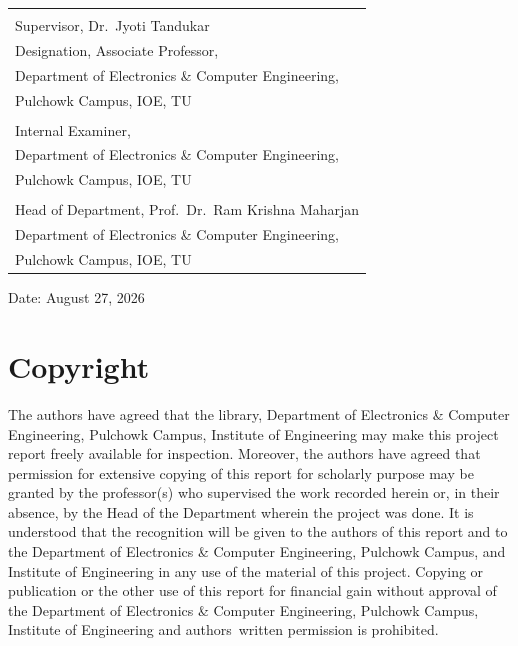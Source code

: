 \documentclass[12pt,a4paper]{report}
\begin{document}
\vspace{0.6cm}
\begin{flushright}
\begin{tabular}{l}
\underline{\hspace{8cm}}\\
Supervisor, Dr.\ Jyoti Tandukar\\
Designation, Associate Professor,\\
Department of Electronics \& Computer Engineering,\\
Pulchowk Campus, IOE, TU\\[0.8cm]

\underline{\hspace{8cm}}\\
Internal Examiner,\\
Department of Electronics \& Computer Engineering,\\
Pulchowk Campus, IOE, TU\\[0.8cm]

\underline{\hspace{8cm}}\\
Head of Department, Prof.\ Dr.\ Ram Krishna Maharjan\\
Department of Electronics \& Computer Engineering,\\
Pulchowk Campus, IOE, TU
\end{tabular}
\end{flushright}

\vfill
\noindent Date: August 27, 2026

\chapter*{Copyright}

The authors have agreed that the library, Department of Electronics \& Computer Engineering, Pulchowk Campus, Institute of Engineering may make this project report freely available for inspection. Moreover, the authors have agreed that permission for extensive copying of this report for scholarly purpose may be granted by the professor(s) who supervised the work recorded herein or, in their absence, by the Head of the Department wherein the project was done. It is understood that the recognition will be given to the authors of this report and to the Department of Electronics \& Computer Engineering, Pulchowk Campus, and Institute of Engineering in any use of the material of this project. Copying or publication or the other use of this report for financial gain without approval of the Department of Electronics \& Computer Engineering, Pulchowk Campus, Institute of Engineering and authors\textquotesingle\ written permission is prohibited.
\end{document}

